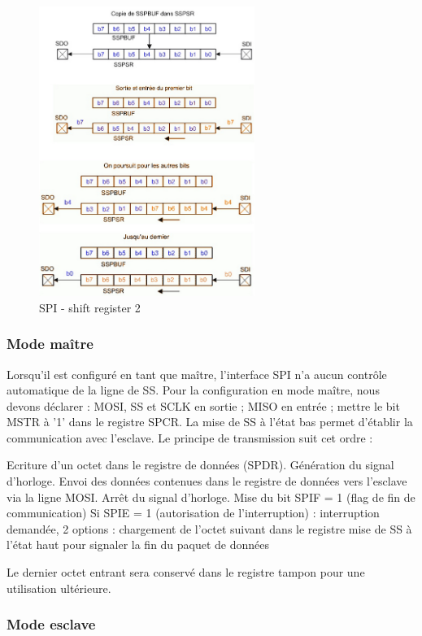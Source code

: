 \documentclass[french,a4paper,12pt]{report}
\begin{document}
	\begin{figure}[!ht]
    \center
  	\includegraphics[width=7cm]{SPI4.png}
    \caption{SPI - shift register 2}
	\end{figure}
 
  		\subsubsection{Mode maître}
  		
  		Lorsqu'il est configuré en tant que maître, l'interface SPI n'a aucun contrôle automatique de la ligne de SS. Pour la configuration en mode maître, nous devons déclarer : MOSI, SS et SCLK en sortie ; MISO en entrée ; mettre le bit MSTR à '1' dans le registre SPCR. La mise de SS à l’état bas permet d'établir la communication avec l’esclave.
Le principe de transmission suit cet ordre :
 
    Ecriture d’un octet dans le registre de données (SPDR).
    Génération du signal d'horloge.
    Envoi des données contenues dans le registre de données vers l’esclave via la ligne MOSI.
    Arrêt du signal d'horloge.
    Mise du bit SPIF = 1 (flag de fin de communication)
    Si SPIE = 1 (autorisation de l’interruption) : interruption demandée, 2 options :
        chargement de l’octet suivant dans le registre
        mise de SS à l’état haut pour signaler la fin du paquet de données
 
	Le dernier octet entrant sera conservé dans le registre tampon pour une utilisation ultérieure.
 
  		\subsubsection{Mode esclave}
  		
\end{document}
